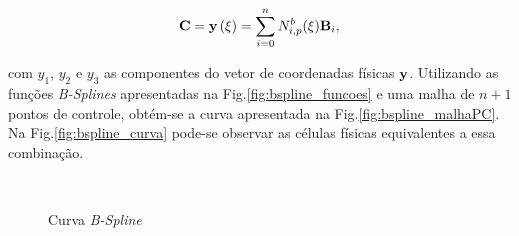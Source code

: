 \documentclass[tese_patricia]{subfiles}
\begin{document}
\begin{align}
\mathbf{C} =\mathbf{y}\left(\xi\right) = \sum_{i=0}^{n}N^b_{i,p}(\xi)\mathbf{B}_i,
\end{align}

\noindent com $y_1$, $y_2$ e $y_3$ as componentes do vetor de coordenadas físicas $\mathbf{y}$. Utilizando as funções \textit{B-Splines} apresentadas na Fig.\ref{fig:bspline_funcoes} e uma malha de $n+1$ pontos de controle, obtém-se a curva apresentada na Fig.\ref{fig:bspline_malhaPC}. Na Fig.\ref{fig:bspline_curva} pode-se observar as células físicas equivalentes a essa combinação.

\begin{figure}[!htb]
	\centering	
	 \ \ 
	\caption{Curva \textit{B-Spline}}
\end{figure}
\end{document}
